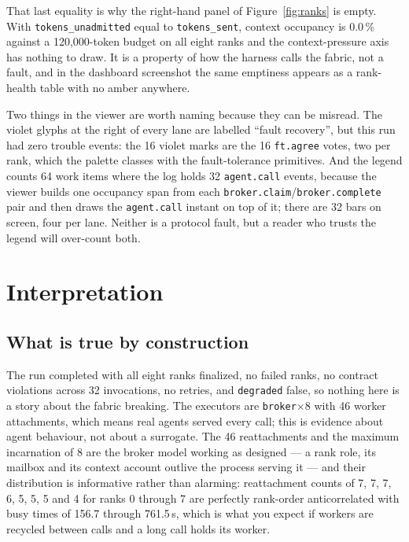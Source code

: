 \documentclass[11pt]{article}
\begin{document}
That last equality is why the right-hand panel of Figure~\ref{fig:ranks} is empty. With
\texttt{tokens\_unadmitted} equal to \texttt{tokens\_sent}, context occupancy is 0.0\,\% against
a 120,000-token budget on all eight ranks and the context-pressure axis has nothing to draw. It
is a property of how the harness calls the fabric, not a fault, and in the dashboard screenshot
the same emptiness appears as a rank-health table with no amber anywhere.

Two things in the viewer are worth naming because they can be misread. The violet glyphs at the
right of every lane are labelled ``fault recovery'', but this run had zero trouble events: the
16 violet marks are the 16 \texttt{ft.agree} votes, two per rank, which the palette classes with
the fault-tolerance primitives. And the legend counts 64 work items where the log holds 32
\texttt{agent.call} events, because the viewer builds one occupancy span from each
\texttt{broker.claim}/\texttt{broker.complete} pair and then draws the \texttt{agent.call}
instant on top of it; there are 32 bars on screen, four per lane. Neither is a protocol fault,
but a reader who trusts the legend will over-count both.

\section{Interpretation}

\subsection{What is true by construction}

The run completed with all eight ranks finalized, no failed ranks, no contract violations across
32 invocations, no retries, and \texttt{degraded} false, so nothing here is a story about the
fabric breaking. The executors are \texttt{broker}$\times$8 with 46 worker attachments, which
means real agents served every call; this is evidence about agent behaviour, not about a
surrogate. The 46 reattachments and the maximum incarnation of 8 are the broker model working as
designed --- a rank role, its mailbox and its context account outlive the process serving it ---
and their distribution is informative rather than alarming: reattachment counts of 7, 7, 7, 6,
5, 5, 5 and 4 for ranks 0 through 7 are perfectly rank-order anticorrelated with busy times of
156.7 through 761.5\,s, which is what you expect if workers are recycled between calls and a
long call holds its worker.
\end{document}
